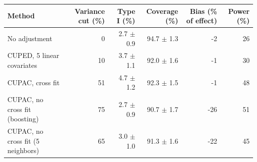 \begin{tabular}{lrrrrr}
\toprule
Method & Variance cut (\%) & Type I (\%) & Coverage (\%) & Bias (\% of effect) & Power (\%) \\
\midrule
No adjustment & 0 & 2.7 $\pm$ 0.9 & 94.7 $\pm$ 1.3 & -2 & 26 \\
CUPED, 5 linear covariates & 10 & 3.7 $\pm$ 1.1 & 92.0 $\pm$ 1.6 & -1 & 30 \\
CUPAC, cross fit & 51 & 4.7 $\pm$ 1.2 & 92.3 $\pm$ 1.5 & -1 & 48 \\
CUPAC, no cross fit (boosting) & 75 & 2.7 $\pm$ 0.9 & 90.7 $\pm$ 1.7 & -26 & 51 \\
CUPAC, no cross fit (5 neighbors) & 65 & 3.0 $\pm$ 1.0 & 91.3 $\pm$ 1.6 & -22 & 45 \\
\bottomrule
\end{tabular}
